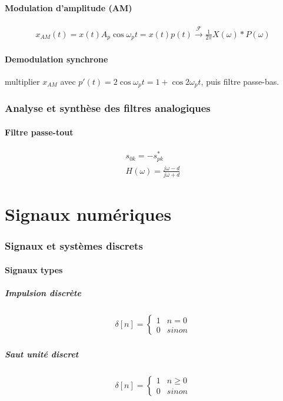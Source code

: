 \documentclass[a4paper]{amsart}
\begin{document}
\subsection{Modulation d'amplitude (AM)}
\begin{eqnarray}
	x_{AM}(t)=x(t)A_p\cos{\omega_p t}=x(t)p(t)\xrightarrow{\mathcal{F}}\frac{1}{2\pi}X(\omega)*P(\omega)
\end{eqnarray}
\subsection{Demodulation synchrone}
multiplier $x_{AM}$ avec $p'(t)=2\cos{\omega_p t}=1+\cos{2\omega_pt}$, puis filtre passe-bas.

\section{Analyse et synthèse des filtres analogiques}
\subsection{Filtre passe-tout}
\begin{eqnarray}
	s_{0k}=-s_{pk}^*\\
	H(\omega)=\frac{j\omega-d}{j\omega+d}
\end{eqnarray}
\newpage


\part{Signaux numériques}
\section{Signaux et systèmes discrets}
\subsection{Signaux types}
\subsubsection{Impulsion discrète}
\begin{eqnarray}
	\delta[n]=\begin{cases}
		1 & n=0\\
		0 & sinon
	\end{cases}
\end{eqnarray}

\subsubsection{Saut unité discret}
\begin{eqnarray}
	\delta[n]=\begin{cases}
		1 & n\geq0\\
		0 & sinon
	\end{cases}
\end{eqnarray}
\end{document}
